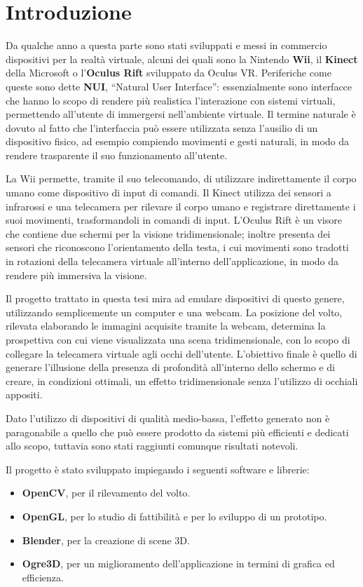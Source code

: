 
\chapter*{Introduzione}

Da qualche anno a questa parte sono stati sviluppati e messi in commercio dispositivi per la realtà virtuale, alcuni dei quali sono la Nintendo \textbf{Wii}, il \textbf{Kinect} della Microsoft o l'\textbf{Oculus Rift} sviluppato da Oculus VR. Periferiche come queste sono dette \textbf{NUI}, “Natural User Interface”\cite{NUI}: essenzialmente sono interfacce che hanno lo scopo di rendere più realistica l'interazione con sistemi virtuali, permettendo all'utente di immergersi nell'ambiente virtuale. Il termine naturale è dovuto al fatto che l'interfaccia può essere utilizzata senza l'ausilio di un dispositivo fisico, ad esempio compiendo movimenti e gesti naturali, in modo da rendere trasparente il suo funzionamento all'utente.

La Wii permette, tramite il suo telecomando, di utilizzare indirettamente il corpo umano come dispositivo di input di comandi. Il Kinect utilizza dei sensori a infrarossi e una telecamera per rilevare il corpo umano e registrare direttamente i suoi movimenti, trasformandoli in comandi di input. L'Oculus Rift è un visore che contiene due schermi per la visione tridimensionale; inoltre presenta dei sensori che riconoscono l'orientamento della testa, i cui movimenti sono tradotti in rotazioni della telecamera virtuale all'interno dell'applicazione, in modo da rendere più immersiva la visione.

Il progetto trattato in questa tesi mira ad emulare dispositivi di questo genere, utilizzando semplicemente un computer e una webcam. La posizione del volto, rilevata elaborando le immagini acquisite tramite la webcam, determina la prospettiva con cui viene visualizzata una scena tridimensionale, con lo scopo di collegare la telecamera virtuale agli occhi dell'utente. L'obiettivo finale è quello di generare l'illusione della presenza di profondità all'interno dello schermo e di creare, in condizioni ottimali, un effetto tridimensionale senza l'utilizzo di occhiali appositi.

Dato l'utilizzo di dispositivi di qualità medio-bassa, l'effetto generato non è paragonabile a quello che può essere prodotto da sistemi più efficienti e dedicati allo scopo, tuttavia sono stati raggiunti comunque risultati notevoli.

Il progetto è stato sviluppato impiegando i seguenti software e librerie:
\begin{itemize}
\item \textbf{OpenCV}, per il rilevamento del volto.
\item \textbf{OpenGL}, per lo studio di fattibilità e per lo sviluppo di un prototipo.
\item \textbf{Blender}, per la creazione di scene 3D.
\item \textbf{Ogre3D}, per un miglioramento dell'applicazione in termini di grafica ed efficienza.
\end{itemize}

